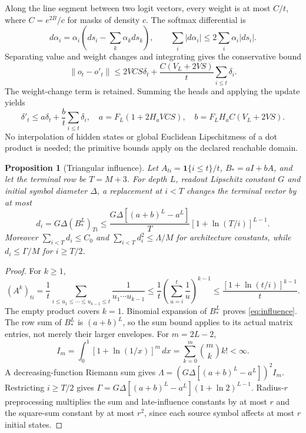 \documentclass[11pt,letterpaper]{article}
\newtheorem{proposition}[theorem]{Proposition}
\theoremstyle{definition}\newtheorem{definition}[theorem]{Definition}
\theoremstyle{remark}\newtheorem{remark}[theorem]{Remark}
\newcommand{\ind}{\mathbf{1}}
\begin{document}
Along the line segment between two logit vectors, every weight is at most $C/t$, where $C=e^{2B}/c$ for masks of density $c$. The softmax differential is
\[
 d\alpha_i=\alpha_i\left(ds_i-\sum_k\alpha_kds_k\right),\qquad
 \sum_i|d\alpha_i|\le2\sum_i\alpha_i|ds_i|.
\]
Separating value and weight changes and integrating gives the conservative bound
\[
 \|o_t-o'_t\|\le2VCS\delta_t+
 \frac{C(V_L+2VS)}{t}\sum_{i\le t}\delta_i.
\]
The weight-change term is retained. Summing the heads and applying the update yields
\begin{equation}\label{eq:recurrence}
 \delta'_t\le a\delta_t+\frac b t\sum_{i\le t}\delta_i,
 \quad a=F_L(1+2H_aVCS),\quad b=F_LH_aC(V_L+2VS).
\end{equation}
No interpolation of hidden states or global Euclidean Lipschitzness of a dot product is needed; the primitive bounds apply on the declared reachable domain.

\begin{proposition}[Triangular influence]\label{prop:influence}
Let $A_{ti}=\ind\{i\le t\}/t$, $B_*=aI+bA$, and let the terminal row be $T=M+3$. For depth $L$, readout Lipschitz constant $G$ and initial symbol diameter $\Delta$, a replacement at $i<T$ changes the terminal vector by at most
\begin{equation}\label{eq:influence}
 d_i=G\Delta(B_*^L)_{Ti}
 \le\frac{G\Delta[(a+b)^L-a^L]}{T}
        [1+\ln(T/i)]^{L-1}.
\end{equation}
Moreover $\sum_{i<T}d_i\le C_0$ and $\sum_{i<T}d_i^2\le\Lambda/M$ for architecture constants, while $d_i\le\Gamma/M$ for $i\ge T/2$.
\end{proposition}
\begin{proof}
For $k\ge1$,
\[
 (A^k)_{ti}=\frac1t\sum_{i\le u_1\le\cdots\le u_{k-1}\le t}
 \frac1{u_1\cdots u_{k-1}}
 \le\frac1t\left(\sum_{u=i}^t\frac1u\right)^{k-1}
 \le\frac{[1+\ln(t/i)]^{k-1}}t.
\]
The empty product covers $k=1$. Binomial expansion of $B_*^L$ proves \eqref{eq:influence}. The row sum of $B_*^L$ is $(a+b)^L$, so the sum bound applies to its actual matrix entries, not merely their larger envelopes. For $m=2L-2$,
\[
 I_m=\int_0^1[1+\ln(1/x)]^m\,dx
     =\sum_{k=0}^m\binom m k k!<\infty.
\]
A decreasing-function Riemann sum gives $\Lambda=(G\Delta[(a+b)^L-a^L])^2I_m$. Restricting $i\ge T/2$ gives $\Gamma=G\Delta[(a+b)^L-a^L](1+\ln2)^{L-1}$. Radius-$r$ preprocessing multiplies the sum and late-influence constants by at most $r$ and the square-sum constant by at most $r^2$, since each source symbol affects at most $r$ initial states.
\end{proof}
\end{document}
